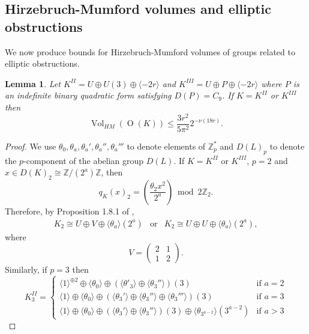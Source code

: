 \documentclass[12pt, a4paper]{article}
\newtheorem{lemma}[thm]{Lemma}
\newcommand{\ZZ}{\mathbb{Z}}
\newcommand{\la}{\langle}
\newcommand{\ra}{\rangle}
\newcommand{\opn}{\operatorname}
\newcommand{\op}{\oplus}
\begin{document}
\subsection{Hirzebruch-Mumford volumes and elliptic obstructions}
We now produce bounds for Hirzebruch-Mumford volumes of groups related to elliptic obstructions.
\begin{lemma}\label{II-III-HMVol}
  Let $K^{II} = U \op U(3) \op \la -2r \ra$ and $K^{III}=U \op P \op \la -2r \ra$ where $P$ is an indefinite binary quadratic form satisfying $D(P)=C_9$.
  If $K=K^{II}$ or $K^{III}$ then 
  \[
  \opn{Vol}_{HM}(\opn{O}(K))
  \leq \frac{3 r^2}{5 \pi^2}   2^{-\nu(18r)}.
  \]
\end{lemma}
\begin{proof}
We use $\theta_0, \theta_a, \theta_a', \theta_a'', \theta_a'''$ to denote elements of $\ZZ_p^*$ and $D(L)_p$ to denote the $p$-component of the abelian group $D(L)$.
If $K=K^{II}$ or $K^{III}$, $p=2$ and $x \in D(K)_2 \cong \ZZ/ (2^a) \ZZ$, then
  \begin{equation*}
    q_K(x)_2 =
    \left ( \frac{\theta_2 x^2}{2^a} \right ) \bmod{ 2\ZZ_2}.
  \end{equation*}
  Therefore, by Proposition 1.8.1 of \cite{Nikulin},
  \begin{equation*}
    \begin{array}{ccc}
      K_2 \cong U \op V \op \la \theta_a \ra (2^a) & \text{or} & K_2 \cong U \op U \op \la \theta_a \ra(2^a),
    \end{array}
  \end{equation*}
  where
  \begin{equation*}
    V =
    \begin{pmatrix}
      2 & 1 \\
      1 & 2
    \end{pmatrix}.
  \end{equation*}
 Similarly, if $p=3$ then
  \begin{equation*}
    K_3^{II} =
    \begin{cases}
      \la 1 \ra^{\op 2} \op \la \theta_0 \ra \op (\la \theta'_3 \ra \op \la \theta_3 '' \ra)(3) & \text{if $a=2$}\\
      \la 1 \ra \op \la \theta_0 \ra \op ( \la \theta_3' \ra \op \la \theta_3'' \ra \op \la \theta_3 ''' \ra)(3)  & \text{if $a=3$} \\
      \la 1 \ra \op \la \theta_0 \ra \op (\la \theta_3' \ra \op \la \theta_3'' \ra)(3) \op \la \theta_{3^{a-2}} \ra (3^{a-2}) & \text{if $a>3$}
    \end{cases}

\end{equation*}
\end{proof}
\end{document}
